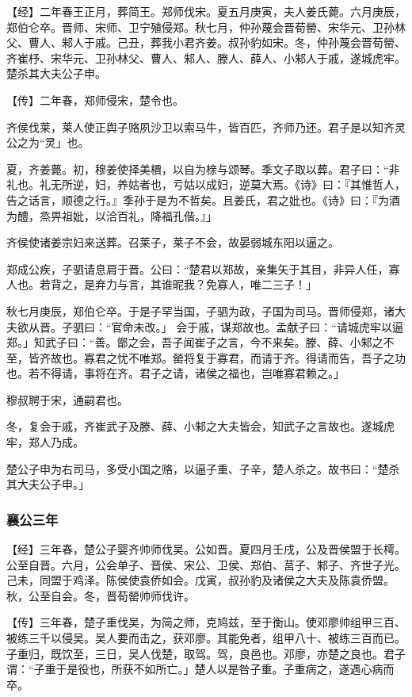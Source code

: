 \documentclass[]{article}
\begin{document}
【经】二年春王正月，葬简王。郑师伐宋。夏五月庚寅，夫人姜氏薨。六月庚辰，郑伯仑卒。晋师、宋师、卫宁殖侵郑。秋七月，仲孙蔑会晋荀罃、宋华元、卫孙林父、曹人、邾人于戚。己丑，葬我小君齐姜。叔孙豹如宋。冬，仲孙蔑会晋荀罃、齐崔杼、宋华元、卫孙林父、曹人、邾人、滕人、薛人、小邾人于戚，遂城虎牢。楚杀其大夫公子申。

【传】二年春，郑师侵宋，楚令也。

齐侯伐莱，莱人使正舆子赂夙沙卫以索马牛，皆百匹，齐师乃还。君子是以知齐灵公之为``灵」也。

夏，齐姜薨。初，穆姜使择美檟，以自为榇与颂琴。季文子取以葬。君子曰：``非礼也。礼无所逆，妇，养姑者也，亏姑以成妇，逆莫大焉。《诗》曰：『其惟哲人，告之话言，顺德之行。』季孙于是为不哲矣。且姜氏，君之妣也。《诗》曰：『为酒为醴，烝畀祖妣，以洽百礼，降福孔偕。』」

齐侯使诸姜宗妇来送葬。召莱子，莱子不会，故晏弱城东阳以逼之。

郑成公疾，子驷请息肩于晋。公曰：``楚君以郑故，亲集矢于其目，非异人任，寡人也。若背之，是弃力与言，其谁昵我？免寡人，唯二三子！」

秋七月庚辰，郑伯仑卒。于是子罕当国，子驷为政，子国为司马。晋师侵郑，诸大夫欲从晋。子驷曰：``官命未改。」
会于戚，谋郑故也。孟献子曰：``请城虎牢以逼郑。」知武子曰：``善。鄫之会，吾子闻崔子之言，今不来矣。滕、薛、小邾之不至，皆齐故也。寡君之忧不唯郑。罃将复于寡君，而请于齐。得请而告，吾子之功也。若不得请，事将在齐。君子之请，诸侯之福也，岂唯寡君赖之。」

穆叔聘于宋，通嗣君也。

冬，复会于戚，齐崔武子及滕、薛、小邾之大夫皆会，知武子之言故也。遂城虎牢，郑人乃成。

楚公子申为右司马，多受小国之赂，以逼子重、子辛，楚人杀之。故书曰：``楚杀其大夫公子申。」

\hypertarget{header-n1831}{%
\subsubsection{襄公三年}\label{header-n1831}}

【经】三年春，楚公子婴齐帅师伐吴。公如晋。夏四月壬戌，公及晋侯盟于长樗。公至自晋。六月，公会单子、晋侯、宋公、卫侯、郑伯、莒子、邾子、齐世子光。己未，同盟于鸡泽。陈侯使袁侨如会。戊寅，叔孙豹及诸侯之大夫及陈袁侨盟。秋，公至自会。冬，晋荀罃帅师伐许。

【传】三年春，楚子重伐吴，为简之师，克鸠兹，至于衡山。使邓廖帅组甲三百、被练三千以侵吴。吴人要而击之，获邓廖。其能免者，组甲八十、被练三百而已。子重归，既饮至，三日，吴人伐楚，取驾。驾，良邑也。邓廖，亦楚之良也。君子谓：``子重于是役也，所获不如所亡。」楚人以是咎子重。子重病之，遂遇心病而卒。
\end{document}
